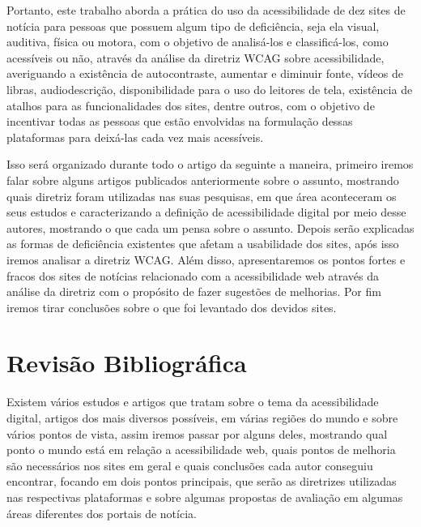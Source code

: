 \documentclass[a4paper]{article}
\begin{document}
\begin{titlepage}
Portanto, este trabalho aborda a prática do uso da acessibilidade de dez sites de notícia para pessoas que possuem algum tipo de deficiência, seja ela visual, auditiva, física ou motora, com o objetivo de analisá-los e classificá-los, como acessíveis ou não, através da análise da diretriz WCAG sobre acessibilidade, averiguando a existência de autocontraste, aumentar e diminuir fonte, vídeos de libras, audiodescrição, disponibilidade para o uso do leitores de tela, existência de atalhos para as funcionalidades dos sites, dentre outros, com o objetivo de incentivar todas as pessoas que estão envolvidas na formulação dessas plataformas para deixá-las cada vez mais acessíveis.

Isso será organizado durante todo o artigo da seguinte a maneira, primeiro iremos falar sobre alguns artigos publicados anteriormente sobre o assunto, mostrando quais diretriz foram utilizadas nas suas pesquisas, em que área aconteceram os seus estudos e caracterizando a definição de acessibilidade digital por meio desse autores, mostrando o que cada um pensa sobre o assunto. Depois serão explicadas as formas de deficiência existentes que afetam a usabilidade dos sites, após isso iremos analisar a diretriz WCAG. Além disso, apresentaremos os pontos fortes e fracos dos sites de notícias relacionado com a acessibilidade web através da análise da diretriz com o propósito de fazer sugestões de melhorias. Por fim iremos tirar conclusões sobre o que foi levantado dos devidos sites.

\section{Revisão Bibliográfica}
Existem vários estudos e artigos que tratam sobre o tema da acessibilidade digital, artigos dos mais diversos possíveis, em várias regiões do mundo e sobre vários pontos de vista, assim iremos passar por alguns deles, mostrando qual ponto o mundo está em relação a acessibilidade web, quais pontos de melhoria são necessários nos sites em geral e quais conclusões cada autor conseguiu encontrar, focando em dois pontos principais, que serão as diretrizes utilizadas nas respectivas plataformas e sobre algumas propostas de avaliação em algumas áreas diferentes dos portais de notícia.


\end{titlepage}
\end{document}

